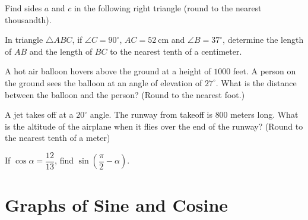 \begin{exercise}
  Find sides $a$ and $c$ in the following right triangle (round to the nearest thousandth).
  
  
\end{exercise}

\begin{exercise}
  In triangle $\triangle ABC$, if 
  \(\angle C = 90^{\circ}\), 
  \(AC = 52\ \text{cm}\) and 
  \(\angle B = 37^{\circ}\), 
  determine the length of $AB$ and the length of $BC$ to the nearest tenth of a centimeter.
\end{exercise}

\newpage

\begin{exercise}
  A hot air balloon hovers above the ground at a
  height of $1000$ feet. A person on the ground sees the balloon at an angle  of elevation of \(27^{\circ}\). What is the distance between the balloon and the person? (Round to the nearest foot.)
\end{exercise}

\begin{exercise}
  A jet takes off at a \(20^{\circ}\) angle.
  The runway from takeoff is $800$ meters long. What is the altitude of the airplane when it flies over the end of the runway? (Round to the nearest tenth of a meter)
\end{exercise}

\begin{exercise}
  If $\cos \alpha = \dfrac{12}{13}$,  find $\sin\left(\dfrac{\pi}{2}-\alpha\right)$.
\end{exercise}

\newpage
\section{Graphs of Sine and Cosine}

